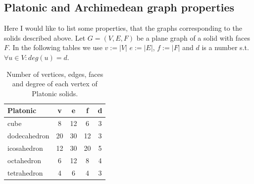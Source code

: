 \begin{highlight}
\section{Platonic and Archimedean graph properties}

Here I would like to list some properties, that the graphs corresponding to the solids described above. Let $G=(V,E,F)$ be a plane graph of a solid with faces $F$. In the following tables we use $v := |V|$ $e := |E|$, $f := |F|$ and $d$ is a number s.t. $\forall u \in V : deg(u) = d$.

\vspace{5pt}

\begin{table}[H]
\centering
\caption{Number of vertices, edges, faces and degree of each vertex of Platonic solids.}
\vspace{5pt}
\label{tab:platonic-basic-props}
\begin{tabular}{|l|c|c|c|c|}
\hline
Platonic & v & e & f & d \\
\hline\hline
cube & 8 & 12 & 6 & 3 \\
\hline
dodecahedron & 20 & 30 & 12 & 3 \\
\hline
icosahedron & 12 & 30 & 20 & 5 \\
\hline
octahedron & 6 & 12 & 8 & 4 \\
\hline
tetrahedron & 4 & 6 & 4 & 3 \\
\hline
\end{tabular}
\end{table}



\end{highlight}
